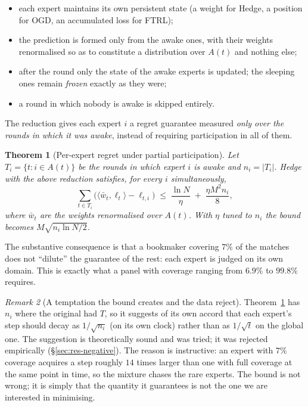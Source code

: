 \documentclass[12pt,a4paper,oneside]{report}
\renewcommand{\_}{\oldunderscore\allowbreak}
\theoremstyle{definition}
\theoremstyle{plain}
\newtheorem{theorem}{Theorem}[chapter]
\theoremstyle{remark}
\newtheorem{remark}[theorem]{Remark}
\begin{document}
\begin{itemize}
  \item each expert maintains its own persistent state (a weight for Hedge, a position for OGD,
        an accumulated loss for FTRL);
  \item the prediction is formed only from the awake ones, with their weights renormalised so
        as to constitute a distribution over $A(t)$ and nothing else;
  \item after the round only the state of the awake experts is updated; the sleeping ones
        remain \emph{frozen} exactly as they were;
  \item a round in which nobody is awake is skipped entirely.
\end{itemize}

The reduction gives each expert $i$ a regret guarantee measured \emph{only over the rounds in
which it was awake}, instead of requiring participation in all of them.

\begin{theorem}[Per-expert regret under partial participation]
\label{thm:sleeping}
Let $T_i = \{t : i \in A(t)\}$ be the rounds in which expert $i$ is awake and $n_i = |T_i|$.
Hedge with the above reduction satisfies, for every $i$ simultaneously,
\[
\sum_{t \in T_i} \Big( \langle \bar{w}_t, \ell_t\rangle - \ell_{t,i} \Big)
\;\leq\; \frac{\ln N}{\eta} \;+\; \frac{\eta M^2 n_i}{8},
\]
where $\bar{w}_t$ are the weights renormalised over $A(t)$. With $\eta$ tuned to $n_i$ the
bound becomes $M\sqrt{n_i \ln N/2}$.
\end{theorem}

The substantive consequence is that a bookmaker covering $7\%$ of the matches does not
``dilute'' the guarantee of the rest: each expert is judged on its own domain. This is exactly
what a panel with coverage ranging from $6.9\%$ to $99.8\%$ requires.

\begin{remark}[A temptation the bound creates and the data reject]
Theorem~\ref{thm:sleeping} has $n_i$ where the original had $T$, so it suggests of its own
accord that each expert's step should decay as $1/\sqrt{n_i}$ (on its own clock) rather than as
$1/\sqrt{t}$ on the global one. The suggestion is theoretically sound and was tried; it was
rejected empirically (\S\ref{sec:res-negative}). The reason is instructive: an expert with
$7\%$ coverage acquires a step roughly $14$ times larger than one with full coverage at the
same point in time, so the mixture chases the rare experts. The bound is not wrong; it is
simply that the quantity it guarantees is not the one we are interested in minimising.
\end{remark}
\end{document}
